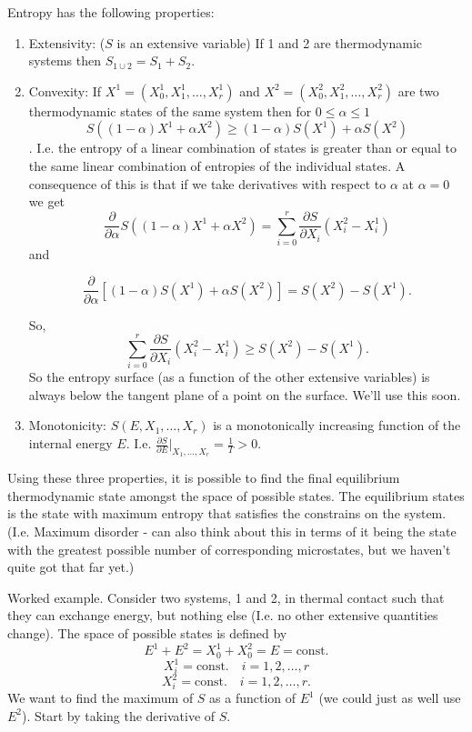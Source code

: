Entropy has the following properties:
\begin{enumerate}
\item Extensivity: ($S$ is an extensive variable) If 1 and 2 are thermodynamic systems then $S_{1\cup2}=S_1+S_2$.
\item Convexity: If $X^1=(X_0^1,X_1^1,\ldots,X_r^1)$ and  $X^2=(X_0^2,X_1^2,\ldots,X_r^2)$ are two thermodynamic states of the same system then for $0\leq\alpha\leq1$
$$ S((1-\alpha)X^1+\alpha X^2)\geq (1-\alpha)S(X^1)+\alpha S(X^2) $$.
I.e. the entropy of a linear combination of states is greater than or equal to the same linear combination of entropies of the individual states.
A consequence of this is that if we take derivatives with respect to $\alpha$ at $\alpha=0$ we get
$$\frac{\partial}{\partial \alpha} S((1-\alpha)X^1+\alpha X^2) = \sum_{i=0}^r\frac{\partial S}{\partial X_i}(X_i^2-X_i^1)$$
and

$$\frac{\partial}{\partial \alpha} \left[ (1-\alpha)S(X^1)+\alpha S(X^2) \right] = S(X^2)-S(X^1).$$

So,
$$ \sum_{i=0}^r\frac{\partial S}{\partial X_i}(X_i^2-X_i^1)\geq  S(X^2)-S(X^1).$$
So the entropy surface (as a function of the other extensive variables) is always below the tangent plane of a point on the surface. We'll use this soon.
\item Monotonicity: $S(E,X_1,\ldots,X_r)$ is a monotonically increasing function of the internal energy $E$. I.e. $\frac{\partial S}{\partial E}\vert_{X_1,\ldots,X_r} = \frac{1}{T}>0$.
\end{enumerate}

Using these three properties, it is possible to find the final equilibrium thermodynamic state amongst the space of possible states. The equilibrium states is the state with maximum entropy that satisfies the constrains on the system. (I.e. Maximum disorder - can also think about this in terms of it being the state with the greatest possible number of corresponding microstates, but we haven't quite got that far yet.)

Worked example. Consider two systems, 1 and 2, in thermal contact such that they can exchange energy, but nothing else (I.e. no other extensive quantities change). The space of possible states is defined by 
$$E^1+E^2 = X_0^1+X_0^2 = E = \text{const.}$$
$$X_i^1 = \text{const.}\quad i=1,2,\ldots,r$$
$$X_i^2 = \text{const.}\quad i=1,2,\ldots,r.$$
We want to find the maximum of $S$ as a function of $E^1$ (we could just as well use $E^2$). Start by taking the derivative of $S$.

